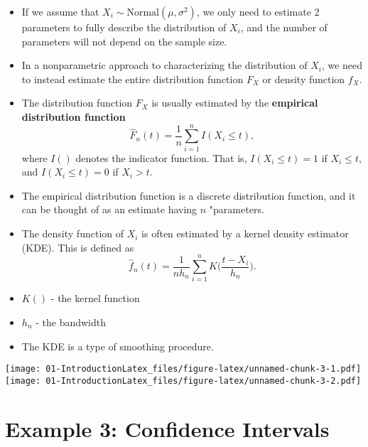 \documentclass[]{book}
\begin{document}
\begin{itemize}
\item
  If we assume that \(X_{i} \sim \textrm{Normal}( \mu, \sigma^{2} )\), we only need to estimate 2 parameters to
  fully describe the distribution of \(X_{i}\), and the number of parameters will not depend on the sample size.
\item
  In a nonparametric approach to characterizing the distribution of \(X_{i}\), we need to instead
  estimate the entire distribution function \(F_{X}\) or density function \(f_{X}\).
\item
  The distribution function \(F_{X}\) is usually estimated by the \textbf{empirical distribution function}
  \begin{equation}
  \hat{F}_{n}(t) = \frac{1}{n}\sum_{i=1}^{n} I( X_{i} \leq t),
  \end{equation}
  where \(I()\) denotes the indicator function. That is, \(I( X_{i} \leq t) = 1\) if \(X_{i} \leq t\),
  and \(I(X_{i} \leq t) = 0\) if \(X_{i} > t\).
\item
  The empirical distribution function is a discrete distribution function,
  and it can be thought of as an estimate having \(n\) "parameters.
\item
  The density function of \(X_{i}\) is often estimated by a kernel density estimator (KDE). This
  is defined as
  \begin{equation}
  \hat{f}_{n}(t) = \frac{1}{n h_{n}} \sum_{i=1}^{n} K\Big( \frac{t - X_{i}}{ h_{n} } \Big).
  \end{equation}
\item
  \(K()\) - the kernel function
\item
  \(h_{n}\) - the bandwidth
\item
  The KDE is a type of smoothing procedure.
\end{itemize}

\texttt{[image: 01-IntroductionLatex\_files/figure-latex/unnamed-chunk-3-1.pdf]} \texttt{[image: 01-IntroductionLatex\_files/figure-latex/unnamed-chunk-3-2.pdf]}

\hypertarget{sec:example-nonpar-confint}{%
\section{Example 3: Confidence Intervals}\label{sec:example-nonpar-confint}}
\end{document}
